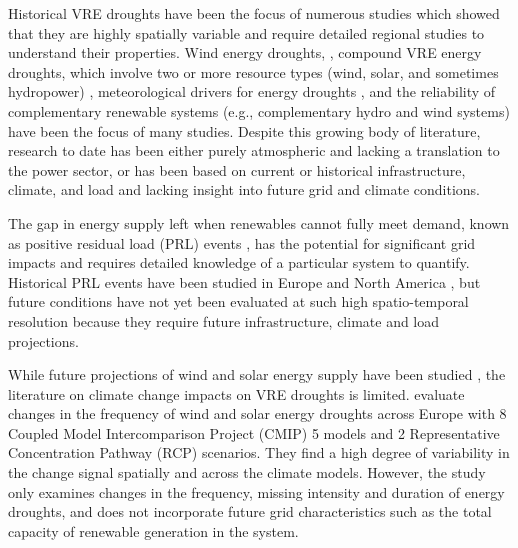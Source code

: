 \documentclass{agujournal2019}
\begin{document}

Historical VRE droughts have been the focus of numerous studies which showed that they are highly spatially variable and require detailed regional studies to understand their properties. Wind energy droughts, \cite{Cannon_2015, Potisomporn_2021, Potisomporn_2023, Potisomporn_2024, Abdelaziz_2024, Leahy_2012, Patlakas_2017, Ohlendorf_2020, Kay_2023}, compound VRE energy droughts, which involve two or more resource types (wind, solar, and sometimes hydropower) \cite{Gburcik2013,Otero2022,Bloomfield2020b,Bett2016,Otero2022a,Raynaud2018,Miglietta2017,Bloomfield2020c,Francois2016c,van_der_Wiel_2019a,GonzalezSalazar2022,FerrazdeAndradeSantos2020a,Bloomfield2022,Brown2021,Doering2018,Rinaldi2021,Amonkar2022,Bracken2024,Zheng_2024}, meteorological drivers for energy droughts \cite{Tong2021,Engeland2017a,Mohammadi2018,Lledo2018,van_der_Wiel_2019a,van_der_Wiel_2019b}, and the reliability of complementary renewable systems (e.g., complementary hydro and wind systems) \cite{Jurasz2018,Solomon2016,Potrc2022} have been the focus of many studies. Despite this growing body of literature, research to date has been either purely atmospheric and lacking a translation to the power sector, or has been based on current or historical infrastructure, climate, and load and lacking insight into future grid and climate conditions. 

The gap in energy supply left when renewables cannot fully meet demand, known as positive residual load (PRL) events \cite{Kittel2024}, has the potential for significant grid impacts and requires detailed knowledge of a particular system to quantify. Historical PRL events have been studied in Europe \cite{Raynaud2018, Otero2022, Otero2022a, Fran_ois_2022,Ruhnau_2022, van_der_Wiel_2019a, van_der_Wiel_2019b} and North America \cite{Rinaldi2021, Bracken2024}, but future conditions have not yet been evaluated at such high spatio-temporal resolution because they require future infrastructure, climate and load projections. 

While future projections of wind and solar energy supply have been studied \cite{Jung_2022,Dutta_2022,Gernaat_2021}, the literature on climate change impacts on VRE droughts is limited.  evaluate changes in the frequency of wind and solar energy droughts across Europe with 8 Coupled Model Intercomparison Project (CMIP) 5 models and 2 Representative Concentration Pathway (RCP) scenarios. They find a high degree of variability in the change signal spatially and across the climate models. However, the study only examines changes in the frequency, missing intensity and duration of energy droughts, and does not incorporate future grid characteristics such as the total capacity of renewable generation in the system. 
\end{document}
